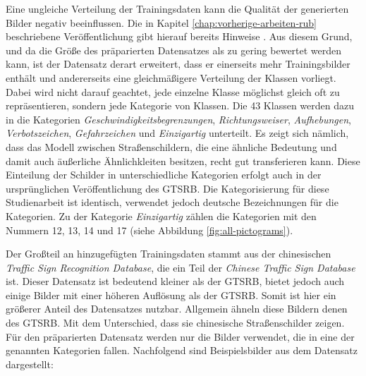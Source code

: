 Eine ungleiche Verteilung der Trainingsdaten kann die Qualität der generierten Bilder negativ beeinflussen. Die in Kapitel \ref{chap:vorherige-arbeiten-rub} beschriebene Veröffentlichung gibt hierauf bereits Hinweise \cite{gtsrbGAN}. Aus diesem Grund, und da die Größe des präparierten Datensatzes als zu gering bewertet werden kann, ist der Datensatz derart erweitert, dass er einerseits mehr Trainingsbilder enthält und andererseits eine gleichmäßigere Verteilung der Klassen vorliegt. Dabei wird nicht darauf geachtet, jede einzelne Klasse möglichst gleich oft zu repräsentieren, sondern jede Kategorie von Klassen. Die 43 Klassen werden dazu in die Kategorien \emph{Geschwindigkeitsbegrenzungen}, \emph{Richtungsweiser}, \emph{Aufhebungen}, \emph{Verbotszeichen}, \emph{Gefahrzeichen} und \emph{Einzigartig} unterteilt. Es zeigt sich nämlich, dass das Modell zwischen Straßenschildern, die eine ähnliche Bedeutung und damit auch äußerliche Ähnlichkleiten besitzen, recht gut transferieren kann. Diese Einteilung der Schilder in unterschiedliche Kategorien erfolgt auch in der ursprünglichen Veröffentlichung des \ac{GTSRB}. Die Kategorisierung für diese Studienarbeit ist identisch, verwendet jedoch deutsche Bezeichnungen für die Kategorien. Zu der Kategorie \emph{Einzigartig} zählen die Kategorien mit den Nummern 12, 13, 14 und 17 (siehe Abbildung \ref{fig:all-pictograms}).

Der Großteil an hinzugefügten Trainingsdaten stammt aus der chinesischen \emph{Traffic Sign Recognition Database}, die ein Teil der \emph{Chinese Traffic Sign Database} ist. Dieser Datensatz ist bedeutend kleiner als der \ac{GTSRB}, bietet jedoch auch einige Bilder mit einer höheren Auflösung als der \ac{GTSRB}. Somit ist  hier ein größerer Anteil des Datensatzes nutzbar. Allgemein ähneln diese Bildern denen des \ac{GTSRB}. Mit dem Unterschied, dass sie chinesische Straßenschilder zeigen. Für den präparierten Datensatz werden nur die Bilder verwendet, die in eine der genannten Kategorien fallen. Nachfolgend sind Beispielsbilder aus dem Datensatz dargestellt: \cite{chinese-dataset}


